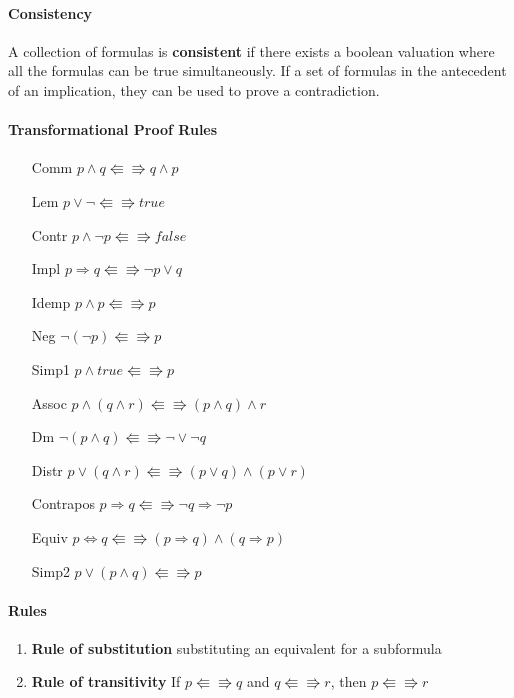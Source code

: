     \paragraph{Consistency} A collection of formulas is \textbf{consistent}
    if there exists a boolean valuation where all the formulas can be true
    simultaneously. If a set of formulas in the antecedent of an
    implication, they can be used to prove a contradiction.

    \paragraph{Transformational Proof Rules}
    \begin{itemize}
      \item[Comm] $p\land q \Lleftarrow\Rrightarrow q\land p$
      \item[Lem] $p\lor\lnot \Lleftarrow\Rrightarrow true$
      \item[Contr] $p\land\lnot p\Lleftarrow\Rrightarrow false$
      \item[Impl] $p \Rightarrow q\Lleftarrow\Rrightarrow \lnot p \lor q$
      \item[Idemp] $p \land p\Lleftarrow\Rrightarrow p$
      \item[Neg] $\lnot(\lnot p)\Lleftarrow\Rrightarrow p$
      \item[Simp1] $p\land true\Lleftarrow\Rrightarrow p$
      \item[Assoc] $p \land (q \land r)\Lleftarrow\Rrightarrow (p \land q)
        \land r$
      \item[Dm] $\lnot(p\land q)\Lleftarrow\Rrightarrow \lnot \lor \lnot q$
      \item[Distr] $p \lor (q \land r)\Lleftarrow\Rrightarrow (p \lor q)
        \land (p \lor r)$
      \item[Contrapos] $p \Rightarrow q\Lleftarrow\Rrightarrow \lnot q
        \Rightarrow \lnot p$
      \item[Equiv] $p \Leftrightarrow q\Lleftarrow\Rrightarrow (p\Rightarrow
        q) \land (q \Rightarrow p)$
      \item[Simp2] $p \lor (p \land q)\Lleftarrow\Rrightarrow p$
    \end{itemize}

    \paragraph{Rules}
      \begin{enumerate}
        \item \textbf{Rule of substitution} substituting an equivalent for a
          subformula
        \item \textbf{Rule of transitivity} If $p\Lleftarrow\Rrightarrow q$ and
          $q\Lleftarrow\Rrightarrow r$, then $p\Lleftarrow\Rrightarrow r$
      \end{enumerate}

